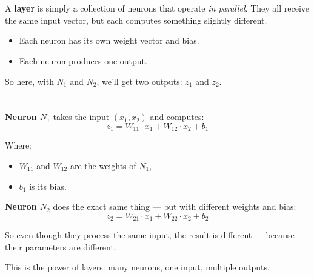 \documentclass[11pt]{article}
\begin{document}
\vspace{2em}

\section*{}

A \textbf{layer} is simply a collection of neurons that operate \textit{in parallel}.  
They all receive the same input vector, but each computes something slightly different.

\begin{itemize}
  \item Each neuron has its own weight vector and bias.
  \item Each neuron produces one output.
\end{itemize}

So here, with $N_1$ and $N_2$, we’ll get two outputs: $z_1$ and $z_2$.

\vspace{2em}

\section*{}

\textbf{Neuron $N_1$} takes the input $(x_1, x_2)$ and computes:
\[
z_1 = W_{11} \cdot x_1 + W_{12} \cdot x_2 + b_1
\]

Where:
\begin{itemize}
  \item $W_{11}$ and $W_{12}$ are the weights of $N_1$,
  \item $b_1$ is its bias.
\end{itemize}

\textbf{Neuron $N_2$} does the exact same thing — but with different weights and bias:
\[
z_2 = W_{21} \cdot x_1 + W_{22} \cdot x_2 + b_2
\]

So even though they process the same input, the result is different — because their parameters are different.

\vspace{1em}

This is the power of layers: many neurons, one input, multiple outputs.

\vspace{2em}

\section*{}
\end{document}
